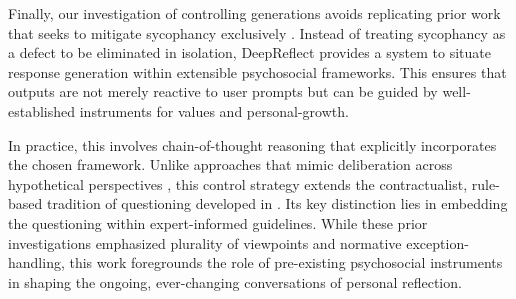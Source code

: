 \medskip Finally, our investigation of controlling generations avoids replicating prior work that seeks to mitigate sycophancy exclusively \cite{cheng-etal-sycophancy}. Instead of treating sycophancy as a defect to be eliminated in isolation, DeepReflect provides a system to situate response generation within extensible psychosocial frameworks. This ensures that outputs are not merely reactive to user prompts but can be guided by well-established instruments for values and personal-growth. 


In practice, this involves chain-of-thought reasoning \cite{cot} that explicitly incorporates the chosen framework. Unlike approaches that mimic deliberation across hypothetical perspectives \cite{socialgaze}, this control strategy extends the contractualist, rule-based tradition of questioning developed in \cite{cot-morals}. Its key distinction lies in embedding the questioning within expert-informed guidelines. While these prior investigations emphasized plurality of viewpoints and normative exception-handling, this work foregrounds the role of pre-existing psychosocial instruments in shaping the ongoing, ever-changing conversations of personal reflection.